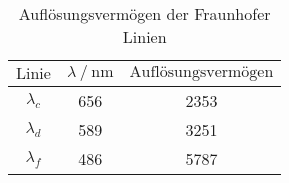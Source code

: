 \begin{table}[H]
  \centering
  \caption{Auflösungsvermögen der Fraunhofer Linien}
  \label{tab:tabe4}
    \begin{tabular}{S S S}
    \toprule
    $ \text{Linie} $ & $ \lambda \: / \: \text{nm} $ & $ \text{Auflösungsvermögen} $ \\
    \midrule
    $\lambda_{c}$ & 656 & 2353 \\
    $\lambda_{d}$ & 589 & 3251 \\
    $\lambda_{f}$ & 486 & 5787 \\

          \bottomrule
    \end{tabular}
  \end{table}
